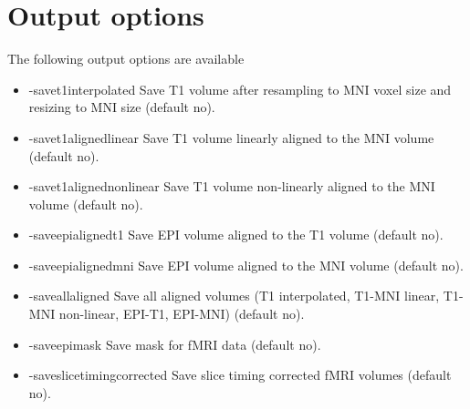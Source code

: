 \section{Output options}

The following output options are available

\begin{itemize}

\item -savet1interpolated        
\newline \newline Save T1 volume after resampling to MNI voxel size and resizing to MNI size (default no). 

\item -savet1alignedlinear       
\newline \newline Save T1 volume linearly aligned to the MNI volume (default no). 

\item -savet1alignednonlinear    
\newline \newline Save T1 volume non-linearly aligned to the MNI volume (default no). 

\item -saveepialignedt1          
\newline \newline Save EPI volume aligned to the T1 volume (default no). 

\item -saveepialignedmni         
\newline \newline Save EPI volume aligned to the MNI volume (default no). 

\item -saveallaligned            
\newline \newline Save all aligned volumes (T1 interpolated, T1-MNI linear, T1-MNI non-linear, EPI-T1, EPI-MNI) (default no). 

\item -saveepimask               
\newline \newline Save mask for fMRI data  (default no). 

\item -saveslicetimingcorrected  
\newline \newline Save slice timing corrected fMRI volumes  (default no). 


\end{itemize}
